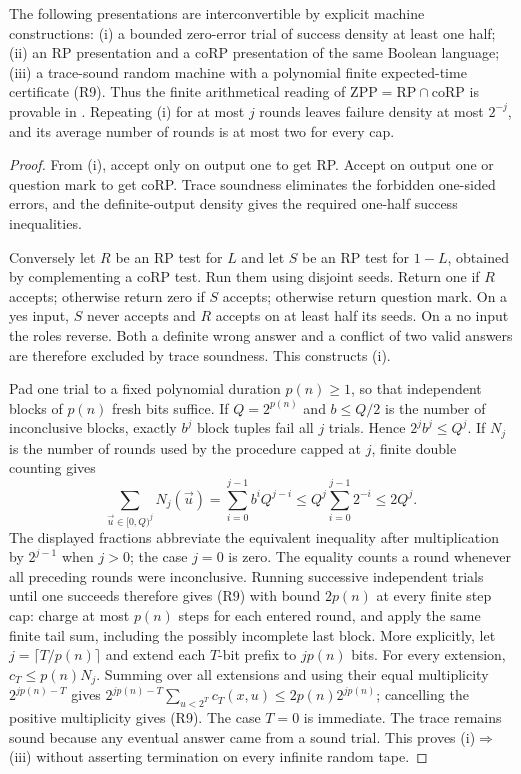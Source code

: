 \begin{theorem}\label{thm:R09}
The following presentations are interconvertible by explicit machine
constructions: (i) a bounded zero-error trial of success density at least
one half; (ii) an RP presentation and a coRP presentation of the same
Boolean language; (iii) a trace-sound random machine with a polynomial
finite expected-time certificate (R9). Thus the finite arithmetical
reading of $\mathrm{ZPP}=\mathrm{RP}\cap\mathrm{coRP}$ is provable in
\ipra. Repeating (i) for at most $j$ rounds leaves failure density at most
$2^{-j}$, and its average number of rounds is at most two for every cap.
\end{theorem}
\begin{proof}
From (i), accept only on output one to get RP. Accept on output one or
question mark to get coRP. Trace soundness eliminates the forbidden
one-sided errors, and the definite-output density gives the required
one-half success inequalities.

Conversely let $R$ be an RP test for $L$ and let $S$ be an RP test for
$1-L$, obtained by complementing a coRP test. Run them using disjoint
seeds. Return one if $R$ accepts; otherwise return zero if $S$ accepts;
otherwise return question mark. On a yes input, $S$ never accepts and
$R$ accepts on at least half its seeds. On a no input the roles reverse.
Both a definite wrong answer and a conflict of two valid answers are
therefore excluded by trace soundness. This constructs (i).

Pad one trial to a fixed polynomial duration $p(n)\geq1$, so that
independent blocks of $p(n)$ fresh bits suffice. If $Q=2^{p(n)}$ and
$b\leq Q/2$ is the number of inconclusive blocks, exactly $b^j$ block
tuples fail all $j$ trials. Hence $2^j b^j\leq Q^j$. If $N_j$ is the
number of rounds used by the procedure capped at $j$, finite double
counting gives
\[
 \sum_{\vec u\in[0,Q)^j} N_j(\vec u)
 =\sum_{i=0}^{j-1} b^i Q^{j-i}
 \leq Q^j\sum_{i=0}^{j-1}2^{-i}\leq2Q^j.
\]
The displayed fractions abbreviate the equivalent inequality after
multiplication by $2^{j-1}$ when $j>0$; the case $j=0$ is zero.
The equality counts a round whenever all preceding rounds were
inconclusive. Running successive independent trials until one succeeds
therefore gives (R9) with bound $2p(n)$ at every finite step cap: charge
at most $p(n)$ steps for each entered round, and apply the same finite
tail sum, including the possibly incomplete last block. More explicitly, let
$j=\lceil T/p(n)\rceil$ and extend each $T$-bit prefix to $jp(n)$ bits.
For every extension, $c_T\leq p(n)N_j$. Summing over all extensions and
using their equal multiplicity $2^{jp(n)-T}$ gives
$2^{jp(n)-T}\sum_{u<2^T}c_T(x,u)\leq2p(n)2^{jp(n)}$; cancelling
the positive multiplicity gives (R9). The case $T=0$ is immediate. The trace remains
sound because any eventual answer came from a sound trial. This proves
(i)$\Rightarrow$(iii) without asserting termination on every infinite
random tape.


\end{proof}
